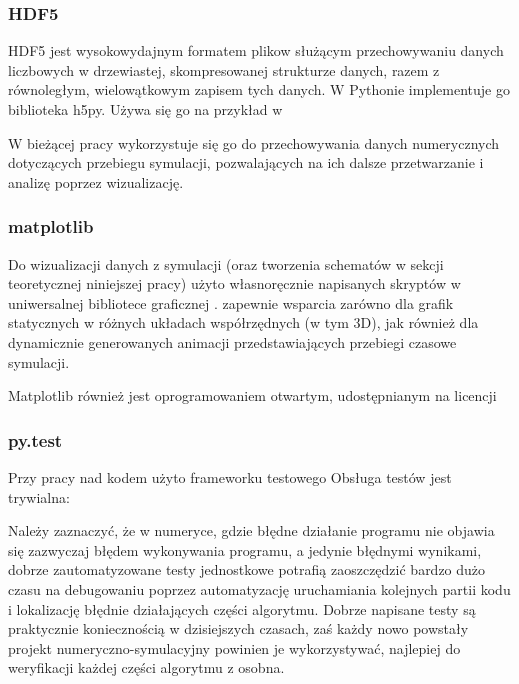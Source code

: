    \subsubsection{HDF5}
    HDF5 jest wysokowydajnym formatem plikow służącym przechowywaniu danych liczbowych w drzewiastej,
    skompresowanej strukturze danych, razem z równoległym, wielowątkowym zapisem tych danych.
    W Pythonie implementuje go biblioteka h5py. 
    Używa się go na przykład w 

    W bieżącej pracy wykorzystuje się go do przechowywania danych numerycznych dotyczących
    przebiegu symulacji, pozwalających na ich dalsze przetwarzanie i analizę poprzez
    wizualizację.

    \subsubsection{matplotlib}
    Do wizualizacji danych z symulacji
    (oraz tworzenia schematów w sekcji teoretycznej niniejszej pracy)
    użyto własnoręcznie napisanych skryptów w uniwersalnej bibliotece graficznej
    .  zapewnie wsparcia zarówno
    dla grafik statycznych w różnych układach współrzędnych (w tym 3D), jak również dla
    dynamicznie generowanych animacji przedstawiających przebiegi czasowe symulacji.

    Matplotlib również jest oprogramowaniem otwartym, udostępnianym na licencji

    \subsubsection{py.test}
    Przy pracy nad kodem użyto frameworku testowego  
    Obsługa testów jest trywialna:


    Należy zaznaczyć, że w numeryce, gdzie błędne działanie programu nie objawia się
    zazwyczaj błędem wykonywania programu, a jedynie błędnymi wynikami, dobrze zautomatyzowane
    testy jednostkowe potrafią zaoszczędzić bardzo dużo czasu na debugowaniu
    poprzez automatyzację uruchamiania kolejnych partii kodu i lokalizację błędnie działających
    części algorytmu. Dobrze napisane testy są praktycznie koniecznością w dzisiejszych
    czasach, zaś każdy nowo powstały projekt numeryczno-symulacyjny powinien je
    wykorzystywać, najlepiej do weryfikacji każdej części algorytmu z osobna.

